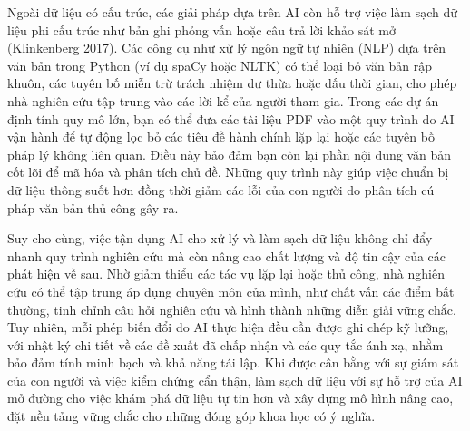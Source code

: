 Ngoài dữ liệu có cấu trúc, các giải pháp dựa trên AI còn hỗ trợ việc làm sạch dữ liệu phi cấu trúc như bản ghi phỏng vấn hoặc câu trả lời khảo sát mở (Klinkenberg 2017). Các công cụ như xử lý ngôn ngữ tự nhiên (NLP) dựa trên văn bản trong Python (ví dụ spaCy hoặc NLTK) có thể loại bỏ văn bản rập khuôn, các tuyên bố miễn trừ trách nhiệm dư thừa hoặc dấu thời gian, cho phép nhà nghiên cứu tập trung vào các lời kể của người tham gia. Trong các dự án định tính quy mô lớn, bạn có thể đưa các tài liệu PDF vào một quy trình do AI vận hành để tự động lọc bỏ các tiêu đề hành chính lặp lại hoặc các tuyên bố pháp lý không liên quan. Điều này bảo đảm bạn còn lại phần nội dung văn bản cốt lõi để mã hóa và phân tích chủ đề. Những quy trình này giúp việc chuẩn bị dữ liệu thông suốt hơn đồng thời giảm các lỗi của con người do phân tích cú pháp văn bản thủ công gây ra.

Suy cho cùng, việc tận dụng AI cho xử lý và làm sạch dữ liệu không chỉ đẩy nhanh quy trình nghiên cứu mà còn nâng cao chất lượng và độ tin cậy của các phát hiện về sau. Nhờ giảm thiểu các tác vụ lặp lại hoặc thủ công, nhà nghiên cứu có thể tập trung áp dụng chuyên môn của mình, như chất vấn các điểm bất thường, tinh chỉnh câu hỏi nghiên cứu và hình thành những diễn giải vững chắc. Tuy nhiên, mỗi phép biến đổi do AI thực hiện đều cần được ghi chép kỹ lưỡng, với nhật ký chi tiết về các đề xuất đã chấp nhận và các quy tắc ánh xạ, nhằm bảo đảm tính minh bạch và khả năng tái lập. Khi được cân bằng với sự giám sát của con người và việc kiểm chứng cẩn thận, làm sạch dữ liệu với sự hỗ trợ của AI mở đường cho việc khám phá dữ liệu tự tin hơn và xây dựng mô hình nâng cao, đặt nền tảng vững chắc cho những đóng góp khoa học có ý nghĩa.


